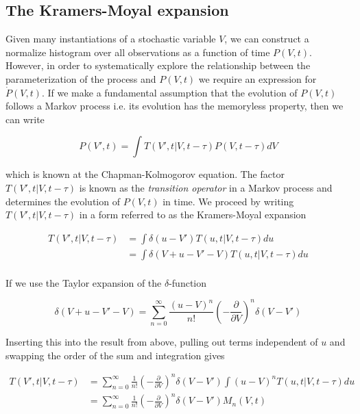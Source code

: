 \documentclass{ucetd}
\begin{document}
\subsection{The Kramers-Moyal expansion}

Given many instantiations of a stochastic variable $V$, we can construct a normalize histogram over all observations as a function of time $P(V,t)$. However, in order to systematically explore the relationship between the parameterization of the process and $P(V,t)$ we require an expression for $\dot{P}(V,t)$. If we make a fundamental assumption that the evolution of $P(V,t)$ follows a Markov process i.e. its evolution has the memoryless property, then we can write

\begin{equation}
P(V', t) = \int T(V', t | V, t-\tau)P(V, t-\tau)dV
\end{equation} 

which is known at the Chapman-Kolmogorov equation. The factor $T(V', t | V, t-\tau)$ is known as the \emph{transition operator} in a Markov process and determines the evolution of $P(V,t)$ in time. We proceed by writing $T(V', t | V, t-\tau)$ in a form referred to as the Kramers-Moyal expansion

\begin{align*}
T(V', t | V, t-\tau) &= \int \delta(u-V')T(u, t | V, t-\tau)du\\
&= \int \delta(V+u-V'-V)T(u, t | V, t-\tau)du\\
\end{align*} 

If we use the Taylor expansion of the $\delta$-function 

\begin{equation*}
\delta(V+u-V'-V) = \sum_{n=0}^{\infty} \frac{(u-V)^{n}}{n!}\left(-\frac{\partial}{\partial V}\right)^{n}\delta(V-V')
\end{equation*}

Inserting this into the result from above, pulling out terms independent of $u$ and swapping the order of the sum and integration gives

\begin{align}
T(V', t | V, t-\tau) &= \sum_{n=0}^{\infty} \frac{1}{n!}\left(-\frac{\partial}{\partial V}\right)^{n}\delta(V-V')\int(u-V)^{n}T(u, t | V, t-\tau)du\\
&= \sum_{n=0}^{\infty} \frac{1}{n!}\left(-\frac{\partial}{\partial V}\right)^{n}\delta(V-V')M_{n}(V,t)
\end{align} 
\end{document}
